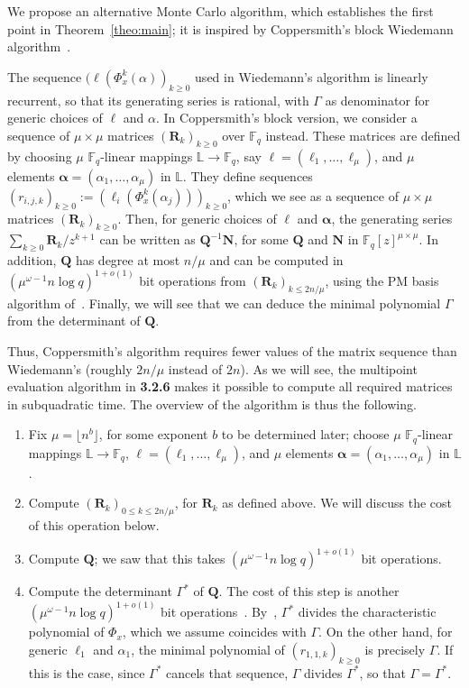 \documentclass[sigconf]{acmart}
\newcommand{\F}{\mathbb{F}}
\renewcommand{\L}{\mathbb{L}}
\begin{document}
We propose an alternative Monte Carlo algorithm, which
establishes the first point in Theorem~\ref{theo:main}; it is
inspired by Coppersmith's block Wiedemann
algorithm~\cite{Coppersmith94}. 

The sequence $(\ell(\Phi_x^k(\alpha))_{k\ge 0}$ used in Wiedemann's
algorithm is linearly recurrent, so that its generating series is
rational, with $\Gamma$ as denominator for generic choices of $\ell$
and $\alpha$. In Coppersmith's block version, we consider a sequence
of $\mu \times \mu$ matrices $({\bm R}_k)_{k \ge 0}$ over $\F_q$
instead. These matrices are defined by choosing $\mu$ $\F_q$-linear
mappings $\L\to\F_q$, say ${\bm \ell}=(\ell_1,\dots,\ell_\mu)$, and
$\mu$ elements ${\bm \alpha}=(\alpha_1,\dots,\alpha_\mu)$ in $\L$.
They define sequences $(r_{i,j,k})_{k \ge 0} :=
(\ell_i(\Phi_x^k(\alpha_j)))_{k \ge 0}$, which we see as a sequence of
$\mu \times \mu$ matrices $({\bm R}_k)_{k \ge 0}$.  Then, for generic
choices of ${\bm \ell}$ and ${\bm \alpha}$, the generating series
$\sum_{k \ge 0} {\bm R}_k / z^{k+1}$ can be written as ${\bm
  Q}^{-1}{\bm N}$, for some ${\bm Q}$ and ${\bm N}$ in $\F_q[z]^{\mu
  \times \mu}$.  In addition, ${\bm Q}$ has degree at most $n/\mu$ and
can be computed in $(\mu^{\omega-1} n \log q)^{1+o(1)}$ bit operations
from $({\bm R}_k)_{k \le 2n/\mu}$, using the PM basis algorithm
of~\cite{GiJeVi03}. Finally, we will see that we can deduce the
minimal polynomial $\Gamma$ from the determinant of ${\bm Q}$.


Thus, Coppersmith's algorithm requires fewer values of the matrix
sequence than Wiedemann's (roughly $2n/\mu$ instead of $2n$). As we
will see, the multipoint evaluation algorithm in {\bf 3.2.6} makes it
possible to compute all required matrices in subquadratic time.
The overview of the algorithm is thus the following.
\begin{enumerate}
\item Fix $\mu=\lfloor n^{b} \rfloor$, for some exponent $b$ to be
  determined later; choose $\mu$ $\F_q$-linear mappings $\L\to\F_q$,
 ${\bm \ell}=(\ell_1,\dots,\ell_\mu)$, and $\mu$ elements ${\bm
    \alpha}=(\alpha_1,\dots,\alpha_\mu)$ in $\L$.  
\item Compute $({\bm R}_k)_{0 \le k \le 2n/\mu}$, for ${\bm R}_k$ as
  defined above. We will discuss the cost of this operation below.
\item Compute ${\bm Q}$; we saw that this takes $(\mu^{\omega-1} n \log q)^{1+o(1)}$ bit operations.
\item Compute the determinant $\Gamma^*$ of ${\bm Q}$.  The cost of
  this step is another $(\mu^{\omega-1} n \log q)^{1+o(1)}$ bit
  operations~\cite{LaNeZh17}.  By~\cite[Th.~2.12]{KaVi04}, $\Gamma^*$
  divides the characteristic polynomial of $\Phi_x$, which we assume
  coincides with $\Gamma$. On the other hand, for generic $\ell_1$ and
  $\alpha_1$, the minimal polynomial of $(r_{1,1,k})_{k \ge 0}$ is
  precisely $\Gamma$. If this is the case, since $\Gamma^*$ cancels
  that sequence, $\Gamma$ divides $\Gamma^*$, so that $\Gamma =
  \Gamma^*$.

\end{enumerate}
\end{document}
